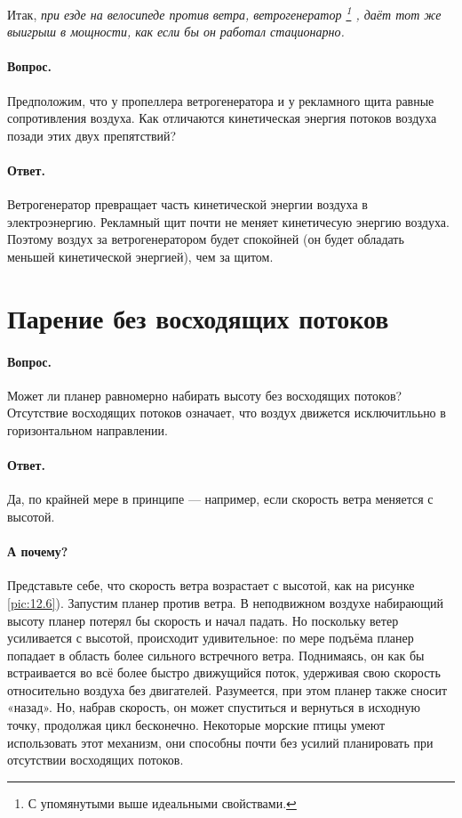 Итак, \emph{при езде на велосипеде против ветра, ветрогенератор%
\footnote{С упомянутыми выше идеальными свойствами.}%
, даёт тот же выигрыш в мощности, как если бы он работал стационарно.}

\paragraph{Вопрос.} Предположим, что у пропеллера ветрогенератора и у рекламного щита равные сопротивления воздуха.
Как отличаются кинетическая энергия потоков воздуха позади этих двух препятствий?

\paragraph{Ответ.}
Ветрогенератор превращает часть кинетической энергии воздуха в электроэнергию.
Рекламный щит почти не меняет кинетичесую энергию воздуха.
Поэтому воздух за ветрогенератором будет спокойней (он будет обладать меньшей кинетической энергией), чем за щитом.

\section{Парение без восходящих потоков}

\paragraph{Вопрос.}
Может ли планер равномерно набирать высоту без восходящих потоков?
Отсутствие восходящих потоков означает, что воздух движется исключитлььно в горизонтальном направлении.

\paragraph{Ответ.}
Да, по крайней мере в принципе — например, если скорость ветра меняется с высотой.

\paragraph{А почему?}
Представьте себе, что скорость ветра возрастает с высотой, как на рисунке \ref{pic:12.6}).
Запустим планер против ветра.
В неподвижном воздухе набирающий высоту планер потерял бы скорость и начал падать.
Но поскольку ветер усиливается с высотой, происходит удивительное: по мере подъёма планер попадает в область более сильного встречного ветра.
Поднимаясь, он как бы встраивается во всё более быстро движущийся поток, удерживая свою скорость относительно воздуха без двигателей.
Разумеется, при этом планер также сносит «назад».
Но, набрав скорость, он может спуститься и вернуться в исходную точку, продолжая цикл бесконечно.
Некоторые морские птицы умеют использовать этот механизм,
они способны почти без усилий планировать при отсутствии восходящих потоков.

